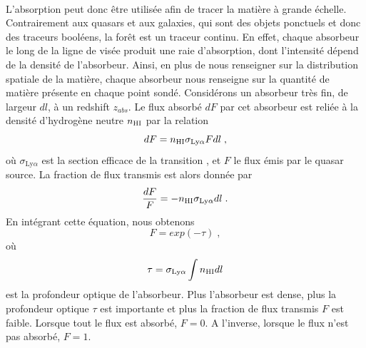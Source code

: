 \paragraph{}
L'absorption \lya{} peut donc être utilisée afin de tracer la matière à grande échelle. Contrairement aux quasars et aux galaxies, qui sont des objets ponctuels et donc des traceurs booléens, la forêt \lya{} est un traceur continu. En effet, chaque absorbeur le long de la ligne de visée produit une raie d'absorption, dont l'intensité dépend de la densité de l'absorbeur. Ainsi, en plus de nous renseigner sur la distribution spatiale de la matière, chaque absorbeur nous renseigne sur la quantité de matière présente en chaque point sondé.
Considérons un absorbeur très fin, de largeur $dl$, à un redshift $z_{abs}$. Le flux absorbé $dF$ par cet absorbeur est reliée à la densité d'hydrogène neutre $n_{\textsc{HI}}$ par la relation
\begin{equation}
  dF = n_{\textsc{HI}} \sigma_{\mathrm{Ly}\alpha} F dl  \; ,
\end{equation}
où $\sigma_{\mathrm{Ly}\alpha}$ est la section efficace de la transition \lya{}, et $F$ le flux émis par le quasar source.
La fraction de flux transmis est alors donnée par
\begin{equation}
 \frac{dF}{F} = - n_{\textsc{HI}} \sigma_{\mathrm{Ly}\alpha} dl  \; .
\end{equation}
En intégrant cette équation, nous obtenons
\begin{equation}
  \label{eq:tff}
  F = exp(- \tau) \; ,
\end{equation}
où
\begin{equation}
  \label{eq:tau}
  \tau = \sigma_{\mathrm{Ly}\alpha} \int n_{\textsc{HI}}   dl
\end{equation}
est la profondeur optique de l'absorbeur. Plus l'absorbeur est dense, plus la profondeur optique $\tau$ est importante et plus la fraction de flux transmis $F$ est faible. Lorsque tout le flux est absorbé, $F = 0$. A l'inverse, lorsque le flux n'est pas absorbé, $F = 1$.

